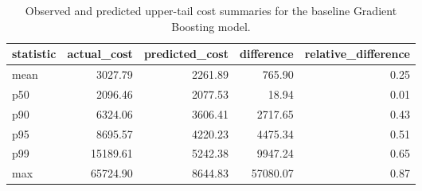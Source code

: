 \begin{table}
\caption{Observed and predicted upper-tail cost summaries for the baseline Gradient Boosting model.}
\label{tab:05-gb-tail-summary}
\begin{tabular}{lrrrr}
\toprule
statistic & actual_cost & predicted_cost & difference & relative_difference \\
\midrule
mean & 3027.79 & 2261.89 & 765.90 & 0.25 \\
p50 & 2096.46 & 2077.53 & 18.94 & 0.01 \\
p90 & 6324.06 & 3606.41 & 2717.65 & 0.43 \\
p95 & 8695.57 & 4220.23 & 4475.34 & 0.51 \\
p99 & 15189.61 & 5242.38 & 9947.24 & 0.65 \\
max & 65724.90 & 8644.83 & 57080.07 & 0.87 \\
\bottomrule
\end{tabular}
\end{table}

